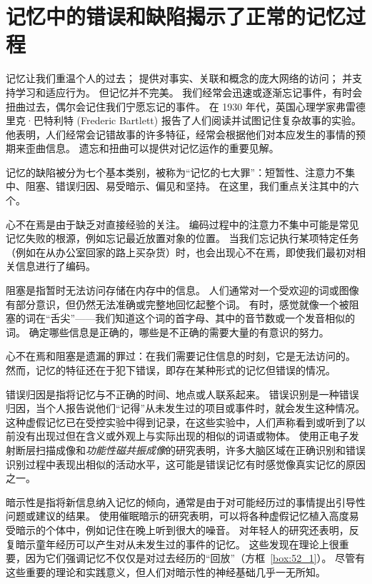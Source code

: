 \section{记忆中的错误和缺陷揭示了正常的记忆过程}

记忆让我们重温个人的过去； 提供对事实、关联和概念的庞大网络的访问； 并支持学习和适应行为。 但记忆并不完美。
我们经常会迅速或逐渐忘记事件，有时会扭曲过去，偶尔会记住我们宁愿忘记的事件。
在 1930 年代，英国心理学家弗雷德里克·巴特利特 (Frederic Bartlett) 报告了人们阅读并试图记住复杂故事的实验。
他表明，人们经常会记错故事的许多特征，经常会根据他们对本应发生的事情的预期来歪曲信息。
遗忘和扭曲可以提供对记忆运作的重要见解。


记忆的缺陷被分为七个基本类别，被称为“记忆的七大罪”：短暂性、注意力不集中、阻塞、错误归因、易受暗示、偏见和坚持。
在这里，我们重点关注其中的六个。


心不在焉是由于缺乏对直接经验的关注。
编码过程中的注意力不集中可能是常见记忆失败的根源，例如忘记最近放置对象的位置。
当我们忘记执行某项特定任务（例如在从办公室回家的路上买杂货）时，也会出现心不在焉，即使我们最初对相关信息进行了编码。


阻塞是指暂时无法访问存储在内存中的信息。
人们通常对一个受欢迎的词或图像有部分意识，但仍然无法准确或完整地回忆起整个词。
有时，感觉就像一个被阻塞的词在“舌尖”——我们知道这个词的首字母、其中的音节数或一个发音相似的词。
确定哪些信息是正确的，哪些是不正确的需要大量的有意识的努力。


心不在焉和阻塞是遗漏的罪过：在我们需要记住信息的时刻，它是无法访问的。
然而，记忆的特征还在于犯下错误，即存在某种形式的记忆但错误的情况。


错误归因是指将记忆与不正确的时间、地点或人联系起来。
错误识别是一种错误归因，当个人报告说他们“记得”从未发生过的项目或事件时，就会发生这种情况。
这种虚假记忆已在受控实验中得到记录，在这些实验中，人们声称看到或听到了以前没有出现过但在含义或外观上与实际出现的相似的词语或物体。
使用正电子发射断层扫描成像和\textit{功能性磁共振成像}的研究表明，许多大脑区域在正确识别和错误识别过程中表现出相似的活动水平，这可能是错误记忆有时感觉像真实记忆的原因之一。


暗示性是指将新信息纳入记忆的倾向，通常是由于对可能经历过的事情提出引导性问题或建议的结果。
使用催眠暗示的研究表明，可以将各种虚假记忆植入高度易受暗示的个体中，例如记住在晚上听到很大的噪音。
对年轻人的研究还表明，反复暗示童年经历可以产生对从未发生过的事件的记忆。
这些发现在理论上很重要，因为它们强调记忆不仅仅是对过去经历的“回放”（方框~\ref{box:52_1}）。
尽管有这些重要的理论和实践意义，但人们对暗示性的神经基础几乎一无所知。


